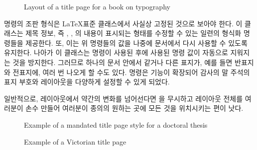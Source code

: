 \documentclass[10pt,a4paper]{oblivoir}
\begin{document}
\begin{figure}
\centering
\caption{Layout of a title page for a book on typography}\label{figure:titleTH}
\end{figure}

\cmd{\maketitle} 명령의 조판 형식은 \LaTeX 표준 클래스에서 사실상 고정된
것으로 보아야 한다.
이 클래스는 제목 정보, 즉 \cmd{\title}, \cmd{\author}, \cmd{\date}의 내용이
표시되는 형태를 수정할 수 있는 일련의 형식화 명령들을 제공한다.
또, 이는 위 명령들의 값을 나중에 문서에서 다시 사용할 수 있도록 유지한다.
나아가 이 클래스는 \cmd{\maketitle} 명령이 사용된 후에 사용된 명령 값이
자동으로 지워지는 것을 방지한다.
그러므로 하나의 문서 안에서 같거나 다른 표지가, 예를 들면 반표지와 전표지에,
여러 번 나오게 할 수도 있다.
\cmd{\thanks} 명령은 기능이 확장되어 감사의 말 주석의 표지 부호와 레이아웃을
다양하게 설정할 수 있게 되었다.

일반적으로, \cmd{\maketitle} 레이아웃에서 약간의 변화를 넘어선다면
\cmd{\maketitle}을 무시하고 레이아웃 전체를 여러분이 손수 만들어 여러분이
종의의 원하는 곳에 모든 것을 위치시키는 편이 낫다.

\begin{figure}
\centering
\caption{Example of a mandated title page style for a doctoral thesis}\label{figure:titleDS}
\end{figure}

\begin{figure}%
\centering
\caption{Example of a Victorian title page}\label{figure:titleRB}
\end{figure}
\end{document}
